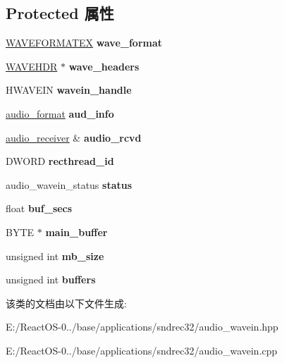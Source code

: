 \subsection*{Protected 属性}
\begin{DoxyCompactItemize}
\item 
\mbox{\label{classaudio__wavein_a2b679d2e5e46494e5c84742606473fda}} 
\hyperlink{struct_w_a_v_e_f_o_r_m_a_t_e_x}{W\+A\+V\+E\+F\+O\+R\+M\+A\+T\+EX} {\bfseries wave\+\_\+format}
\item 
\mbox{\label{classaudio__wavein_a94fada2ebb68fa71cc287b1475953671}} 
\hyperlink{structwavehdr__tag}{W\+A\+V\+E\+H\+DR} $\ast$ {\bfseries wave\+\_\+headers}
\item 
\mbox{\label{classaudio__wavein_ab3e56d23bcc5da858609a50c173da520}} 
H\+W\+A\+V\+E\+IN {\bfseries wavein\+\_\+handle}
\item 
\mbox{\label{classaudio__wavein_a887af4e36b2a8cf53d646e3d083e47ba}} 
\hyperlink{classaudio__format}{audio\+\_\+format} {\bfseries aud\+\_\+info}
\item 
\mbox{\label{classaudio__wavein_ab86cefd36e0624d080406074ed0068cc}} 
\hyperlink{classaudio__receiver}{audio\+\_\+receiver} \& {\bfseries audio\+\_\+rcvd}
\item 
\mbox{\label{classaudio__wavein_a4680e274ac281c9f19fc0d99cad728b4}} 
D\+W\+O\+RD {\bfseries recthread\+\_\+id}
\item 
\mbox{\label{classaudio__wavein_a42602e8c354953dfbf4e885a2d66cf2e}} 
audio\+\_\+wavein\+\_\+status {\bfseries status}
\item 
\mbox{\label{classaudio__wavein_abeea45c5179efddeaad758eac304308d}} 
float {\bfseries buf\+\_\+secs}
\item 
\mbox{\label{classaudio__wavein_a09592fd4074a3e1b20afe7b5f85d93ba}} 
B\+Y\+TE $\ast$ {\bfseries main\+\_\+buffer}
\item 
\mbox{\label{classaudio__wavein_ae277f50210776db79f8b13871938b325}} 
unsigned int {\bfseries mb\+\_\+size}
\item 
\mbox{\label{classaudio__wavein_ac4f17b17adc90bb07a7ba708332005c4}} 
unsigned int {\bfseries buffers}
\end{DoxyCompactItemize}


该类的文档由以下文件生成\+:\begin{DoxyCompactItemize}
\item 
E\+:/\+React\+O\+S-\/0../base/applications/sndrec32/audio\+\_\+wavein.\+hpp\item 
E\+:/\+React\+O\+S-\/0../base/applications/sndrec32/audio\+\_\+wavein.\+cpp\end{DoxyCompactItemize}
